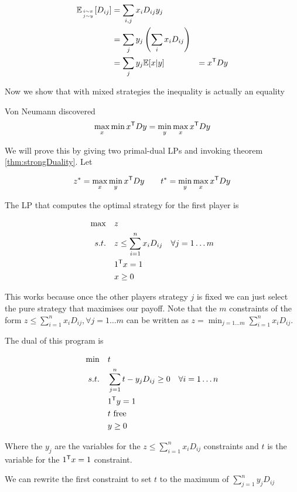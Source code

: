 \begin{align*}
\mathbb{E}_{{i\sim x}\atop {j\sim y}} [D_{ij}] &= \sum_{i,j} x_i D_{ij}y_j\\
	&=\sum_j y_j \left(\sum_i x_iD_{ij}\right)\\
	&=\sum_j y_j \mathbb{E}[x|y]
	&={x}^\text{\upshape \sffamily T} D y
\end{align*}

Now we show that with mixed strategies the inequality is actually an equality

\begin{thm} Von Neumann discovered
\[\max_x\min {x}^\text{\upshape \sffamily T}Dy = \min_y\max_x {x}^\text{\upshape \sffamily T} Dy\]
\end{thm}

\begin{pr} We will prove this by giving two primal-dual LPs and invoking theorem \ref{thm:strongDuality}. Let

\[z^* = \max_x \min_y {x}^\text{\upshape \sffamily T} Dy \qquad t^*= \min_y\max_x {x}^\text{\upshape \sffamily T} D y\]

The LP that computes the optimal strategy for the first player is

\begin{align*}
\max \quad & z\\
s.t.\quad & z \leq \sum_{i=1}^n x_i D_{ij} & \forall j=1\ldots m\\
&{1}^\text{\upshape \sffamily T} x = 1\\
&x\geq 0
\end{align*}

This works because once the other players strategy $j$ is fixed we can just select the pure strategy that maximises our payoff. Note that the $m$ constraints of the form $z \leq \sum_{i=1}^n x_i D_{ij}, \forall j=1 \ldots m$ can be written as $z=\min_{j=1\ldots m} \sum_{i=1}^n x_i D_{ij}$.

The dual of this program is

\begin{align*}
\min \quad & t \\
s.t.\quad & \sum_{j=1}^n t-y_jD_{ij}  \geq 0 & \forall i=1\ldots n\\
& {1}^\text{\upshape \sffamily T} y = 1\\
&t \text{ free}\\
&y\geq 0
\end{align*}

Where the $y_j$ are the variables for the $z \leq \sum_{i=1}^n x_i D_{ij}$ constraints and $t$ is the variable for the ${1}^\text{\upshape \sffamily T} x=1$ constraint. 

We can rewrite the first constraint to set $t$ to the maximum of $\sum_{j=1}^n y_jD_{ij}$


\end{pr}
